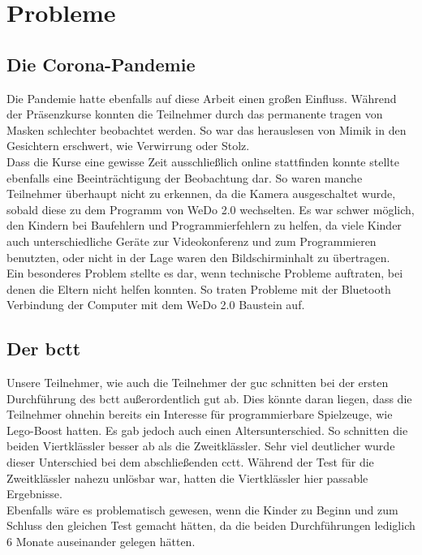 \section{Probleme}\label{sec:problems}
\subsection{Die Corona-Pandemie}
Die Pandemie hatte ebenfalls auf diese Arbeit einen großen Einfluss. Während der Präsenzkurse konnten die Teilnehmer durch das permanente tragen von Masken schlechter beobachtet werden. So war das herauslesen von Mimik in den Gesichtern erschwert, wie Verwirrung oder Stolz. \\
Dass die Kurse eine gewisse Zeit ausschließlich online stattfinden konnte stellte ebenfalls eine Beeinträchtigung der Beobachtung dar. So waren manche Teilnehmer überhaupt nicht zu erkennen, da die Kamera ausgeschaltet wurde, sobald diese zu dem Programm von WeDo 2.0 wechselten. Es war schwer möglich, den Kindern bei Baufehlern und Programmierfehlern zu helfen, da viele Kinder auch unterschiedliche Geräte zur Videokonferenz und zum Programmieren benutzten, oder nicht in der Lage waren den Bildschirminhalt zu übertragen.\\
Ein besonderes Problem stellte es dar, wenn technische Probleme auftraten, bei denen die Eltern nicht helfen konnten. So traten Probleme mit der Bluetooth Verbindung der Computer mit dem WeDo 2.0 Baustein auf.

\subsection{Der \acrlong{bctt}} \label{problemCTT}
Unsere Teilnehmer, wie auch die Teilnehmer der \acrlong{guc} schnitten bei der ersten Durchführung des \acrshort{bctt} außerordentlich gut ab. Dies könnte daran liegen, dass die Teilnehmer ohnehin bereits ein Interesse für programmierbare Spielzeuge, wie \gls{Lego}-Boost hatten. Es gab jedoch auch einen Altersunterschied. So schnitten die beiden Viertklässler besser ab als die Zweitklässler. Sehr viel deutlicher wurde dieser Unterschied bei dem abschließenden \acrshort{cctt}. Während der Test für die Zweitklässler nahezu unlösbar war, hatten die Viertklässler hier passable Ergebnisse.\\
Ebenfalls wäre es problematisch gewesen, wenn die Kinder zu Beginn und zum Schluss den gleichen Test gemacht hätten, da die beiden Durchführungen lediglich 6 Monate auseinander gelegen hätten.

